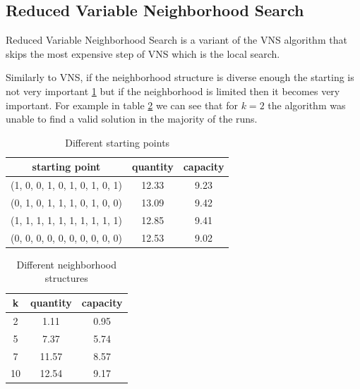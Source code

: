 \subsection{Reduced Variable Neighborhood Search}
Reduced Variable Neighborhood Search is a variant of the VNS algorithm that skips the most expensive step of VNS which is the local search.

Similarly to VNS, if the neighborhood structure is diverse enough the starting is not very important \ref{tab:rvns-start} but if the neighborhood is limited then it becomes very important. For example in table \ref{tab:rvns-neigh} we can see that for $k=2$ the algorithm was unable to find a valid solution in the majority of the runs.
\begin{table}[H]
    \centering
    \begin{tabular}{c||c |c}
        starting point                 & quantity & capacity \\ \hline
        (1, 0, 0, 1, 0, 1, 0, 1, 0, 1) & 12.33    & 9.23     \\
        (0, 1, 0, 1, 1, 1, 0, 1, 0, 0) & 13.09    & 9.42     \\
        (1, 1, 1, 1, 1, 1, 1, 1, 1, 1) & 12.85    & 9.41     \\
        (0, 0, 0, 0, 0, 0, 0, 0, 0, 0) & 12.53    & 9.02     \\
    \end{tabular}
    \caption{Different starting points}
    \label{tab:rvns-start}
\end{table}
\begin{table}[H]
    \centering
    \begin{tabular}{c||c |c}
        k  & quantity & capacity \\ \hline
        2  & 1.11     & 0.95     \\
        5  & 7.37     & 5.74     \\
        7  & 11.57    & 8.57     \\
        10 & 12.54    & 9.17     \\
    \end{tabular}
    \caption{Different neighborhood structures}
    \label{tab:rvns-neigh}
\end{table}